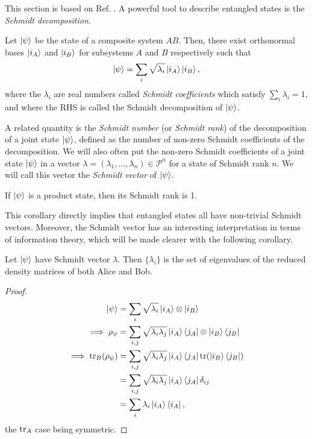 This section is based on Ref. \cite[pp. 109--111]{nielsen_quantum_2010}. A powerful tool to describe entangled states is the \textit{Schmidt decomposition}.

\begin{theorem}
    Let $\ket{\psi}$ be the state of a composite system $AB$. Then, there exist orthonormal bases $\ket{i_A}$ and $\ket{i_B}$ for subsystems $A$ and $B$ respectively such that
    \begin{equation}
        \ket{\psi} = \sum_i \sqrt{\lambda_i} \ket{i_A} \ket{i_B},
    \end{equation}
    where the $\lambda_i$ are real numbers called \textit{Schmidt coefficients} which satisfy $\sum_i \lambda_i = 1$, and where the RHS is called the Schmidt decomposition of $\ket{\psi}$.
\end{theorem}

A related quantity is the \textit{Schmidt number} (or \textit{Schmidt rank}) of the decomposition of a joint state $\ket{\psi}$, defined as the number of non-zero Schmidt coefficients of the decomposition. We will also often put the non-zero Schmidt coefficients of a joint state $\ket{\psi}$ in a vector $\lambda = (\lambda_1, \dots, \lambda_n) \in \mathcal{P}^n$ for a state of Schmidt rank $n$. We will call this vector the \textit{Schmidt vector} of $\ket{\psi}$.

\begin{corollary}
    If $\ket{\psi}$ is a product state, then its Schmidt rank is 1.
\end{corollary}

This corollary directly implies that entangled states all have non-trivial Schmidt vectors. Moreover, the Schmidt vector has an interesting interpretation in terms of information theory, which will be made clearer with the following corollary.

\begin{corollary} \label{cor:reduced_schmidt} %
    Let $\ket{\psi}$ have Schmidt vector $\lambda$. Then $\{\lambda_i\}$ is the set of eigenvalues of the reduced density matrices of both Alice and Bob.
\end{corollary}

\begin{proof}
    \begin{align}
        \ket{\psi} &= \sum_{i} \sqrt{\lambda_i} \ket{i_A} \otimes \ket{i_B}\\
        \implies \rho_\psi &= \sum_{i, j} \sqrt{\lambda_i \lambda_j} \ket{i_A}\bra{j_A} \otimes \ket{i_B}\bra{j_B}\\
        \implies \operatorname{tr}_B(\rho_\psi) &= \sum_{i, j} \sqrt{\lambda_i \lambda_j} \ket{i_A}\bra{j_A} \operatorname{tr}(\ket{i_B} \bra{j_B})\\
                                  &= \sum_{i, j} \sqrt{\lambda_i \lambda_j} \ket{i_A}\bra{j_A} \delta_{ij}\\
                                  &= \sum_{i} \lambda_i \ket{i_A}\bra{i_A},
    \end{align}
    the $\operatorname{tr}_A$ case being symmetric. \qedhere
\end{proof}

